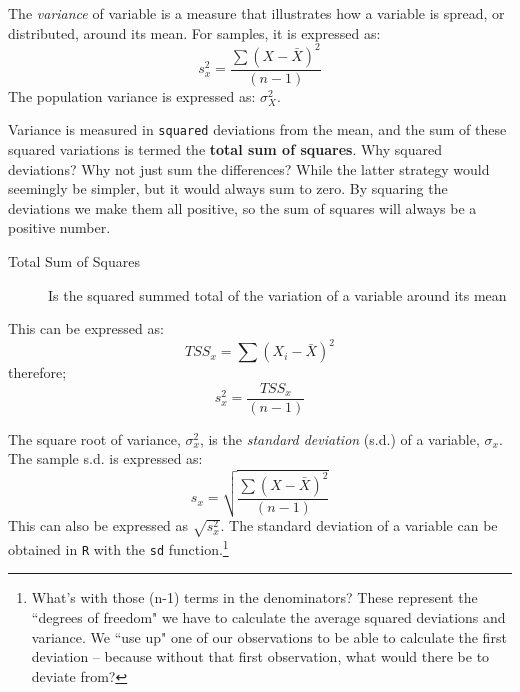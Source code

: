 \documentclass[11pt,openany]{book}\usepackage[]{graphicx}\usepackage[]{color}
\begin{document}
{The \textit{variance} of variable is a measure that illustrates how a variable is spread, or distributed, around its mean. For samples, it is expressed as:  
\begin{equation}
s^{2}_{x}=\frac{\sum (X-\bar{X})^{2}}{(n-1)}  
\end{equation}
The population variance is expressed as: $\sigma^{2}_{X}$. 

Variance is measured in \texttt{squared} deviations from the mean, and the sum of these squared variations is termed the \textbf{total sum of squares}. Why squared deviations? Why not just sum the differences? While the latter strategy would seemingly be simpler, but it would always sum to zero. By squaring the deviations we make them all positive, so the sum of squares will always be a positive number.

\begin{description}
\item[Total Sum of Squares] Is the squared summed total of the variation of a variable around its mean
\end{description}
This can be expressed as: 
\begin{equation}
TSS_{x} = \sum(X_{i}-\bar{X})^{2}   
\end{equation}
therefore; 
\begin{equation}
s^{2}_{x} = \frac{TSS_{x}}{(n-1)}  
\end{equation}

The square root of variance, $\sigma^{2}_{x}$, is the \textit{standard deviation} (s.d.) of a variable, $\sigma_{x}$. The sample s.d. is expressed as: 
\begin{equation}
s_{x} = \sqrt{\frac{\sum(X-\bar{X})^{2}}{(n-1)}}  
\end{equation}
This can also be expressed as $\sqrt{s^2_{x}}$.  The standard deviation of a variable can be obtained in \texttt{R} with the \texttt{sd} function.\footnote{What's with those (n-1) terms in the denominators? These represent the ``degrees of freedom" we have to calculate the average squared deviations and variance. We ``use up" one of our observations to be able to calculate the first deviation -- because without that first observation, what would there be to deviate from?}

}
\end{document}
